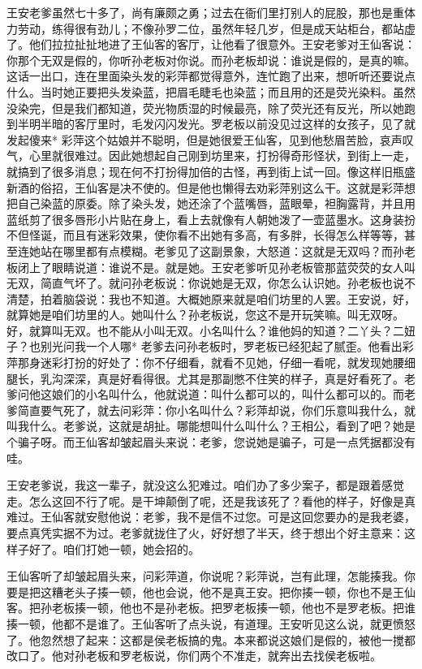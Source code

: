 王安老爹虽然七十多了，尚有廉颇之勇；过去在衙们里打别人的屁股，那也是重体力劳动，练得很有劲儿；不像孙罗二位，虽然年轻几岁，但是成天站柜台，都站虚了。他们拉拉扯扯地进了王仙客的客厅，让他看了很意外。王安老爹对王仙客说：你那个无双是假的，你听孙老板对你说。而孙老板却说：谁说是假的，是真的嘛。这话一出口，连在里面染头发的彩萍都觉得意外，连忙跑了出来，想听听还要说点什么。当时她正要把头发染蓝，把眉毛睫毛也染蓝；而且用的还是荧光染料。虽然没染完，但是我们都知道，荧光物质湿的时候最亮，除了荧光还有反光，所以她跑到半明半暗的客厅里时，毛发闪闪发光。罗老板以前没见过这样的女孩子，见了就发起傻来* 
彩萍这个姑娘并不聪明，但是她很爱王仙客，见到他愁眉苦脸，哀声叹气，心里就很难过。因此她想起自己刚到坊里来，打扮得奇形怪状，到街上一走，就搞到了很多消息；现在何不打扮得加倍的古怪，再到街上试一回。像这样旧瓶盛新酒的俗招，王仙客是决不使的。但是他也懒得去劝彩萍别这么干。这就是彩萍想把自己染蓝的原委。除了染头发，她还涂了个蓝嘴唇，蓝眼晕，袒胸露背，并且用蓝纸剪了很多唇形小片贴在身上，看上去就像有人朝她泼了一壶蓝墨水。这身装扮不但怪诞，而且有迷彩效果，使你看不出她有多高，有多胖，长得怎么样等等，甚至连她站在哪里都有点模糊。老爹见了这副景象，大怒道：这就是无双吗？而孙老板闭上了眼睛说道：谁说不是。就是她。王安老爹听见孙老板管那蓝荧荧的女人叫无双，简直气坏了。就问孙老板说：你说她是无双，你怎么认识她。孙老板也说不清楚，拍着脑袋说：我也不知道。大概她原来就是咱们坊里的人罢。王安说，好，就算她是咱们坊里的人。她叫什么？孙老板说，您这不是开玩笑嘛。叫无双呀。好，就算叫无双。也不能从小叫无双。小名叫什么？谁他妈的知道？二丫头？二妞子？也别光问我一个人哪* 
老爹去问孙老板时，罗老板已经犯起了腻歪。他看出彩萍那身迷彩打扮的好处了：你不仔细看，就看不见她，仔细一看呢，就发现她腰细腿长，乳沟深深，真是好看得很。尤其是那副憋不住笑的样子，真是好看死了。老爹问他这娘们的小名叫什么，他就说道：叫什么都可以的，叫什么都可以的。而老爹简直要气死了，就去问彩萍：你小名叫什么？彩萍却说，你们乐意叫我什么，就叫我什么。老爹说，这就是胡扯。哪能想叫什么叫什么？王相公，看到了吧？她是个骗子呀。而王仙客却皱起眉头来说：老爹，您说她是骗子，可是一点凭据都没有哇。 

王安老爹说，我这一辈子，就没这么犯难过。咱们办了多少案子，都是跟着感觉走。怎么这回不行了呢。是干坤颠倒了呢，还是我该死了？看他的样子，好像是真难过。王仙客就安慰他说：老爹，我不是信不过您。可是这回您要办的是我老婆，要点真凭实据不为过。老爹就拢住了火，好好想了半天，终于想出个好主意来：这样子好了。咱们打她一顿，她会招的。 

王仙客听了却皱起眉头来，问彩萍道，你说呢？彩萍说，岂有此理，怎能揍我。你要是把这糟老头子揍一顿，他也会说，他不是真王安。把你揍一顿，你也不是王仙客。把孙老板揍一顿，他也不是孙老板。把罗老板揍一顿，他也不是罗老板。把谁揍一顿，他都不是谁了。王仙客听了点头说，有道理。王安听见这么说，就更愤怒了。他忽然想了起来：这都是侯老板搞的鬼。本来都说这娘们是假的，被他一搅都改口了。他对孙老板和罗老板说，你们两个不准走，就奔出去找侯老板啦。 

